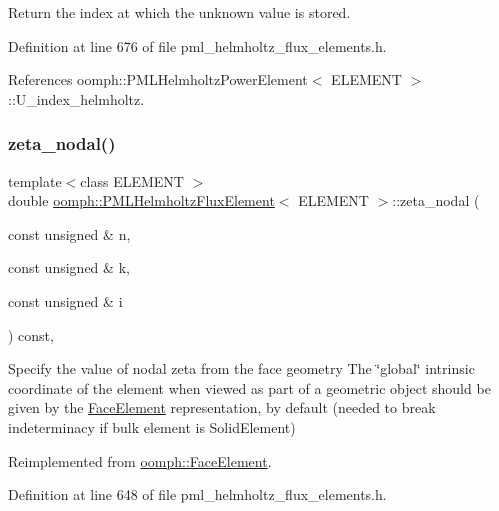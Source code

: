 Return the index at which the unknown value is stored. 



Definition at line 676 of file pml\+\_\+helmholtz\+\_\+flux\+\_\+elements.\+h.



References oomph\+::\+P\+M\+L\+Helmholtz\+Power\+Element$<$ E\+L\+E\+M\+E\+N\+T $>$\+::\+U\+\_\+index\+\_\+helmholtz.

\mbox{\label{classoomph_1_1PMLHelmholtzFluxElement_a660d5d2b8d4b49a504b0f6c95348891a}} 
\subsubsection{\texorpdfstring{zeta\+\_\+nodal()}{zeta\_nodal()}}
{\footnotesize\ttfamily template$<$class E\+L\+E\+M\+E\+NT $>$ \\
double \hyperlink{classoomph_1_1PMLHelmholtzFluxElement}{oomph\+::\+P\+M\+L\+Helmholtz\+Flux\+Element}$<$ E\+L\+E\+M\+E\+NT $>$\+::zeta\+\_\+nodal (\begin{DoxyParamCaption}\item[{const unsigned \&}]{n,  }\item[{const unsigned \&}]{k,  }\item[{const unsigned \&}]{i }\end{DoxyParamCaption}) const\hspace{0.3cm}{\ttfamily [inline]}, {\ttfamily [virtual]}}



Specify the value of nodal zeta from the face geometry The \char`\"{}global\char`\"{} intrinsic coordinate of the element when viewed as part of a geometric object should be given by the \hyperlink{classoomph_1_1FaceElement}{Face\+Element} representation, by default (needed to break indeterminacy if bulk element is Solid\+Element) 



Reimplemented from \hyperlink{classoomph_1_1FaceElement_a58c9f93705c7741f76c8487d152e68a6}{oomph\+::\+Face\+Element}.



Definition at line 648 of file pml\+\_\+helmholtz\+\_\+flux\+\_\+elements.\+h.



